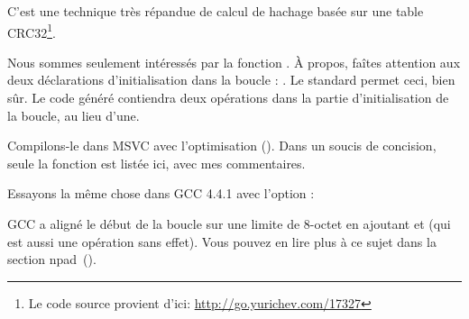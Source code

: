 \label{sec:CRC32}

\newcommand{\URLCRCSRC}{\url{http://go.yurichev.com/17327}}

C'est une technique très répandue de calcul de hachage basée sur une table
CRC32\footnote{Le code source provient d'ici: \URLCRCSRC}.




Nous sommes seulement intéressés par la fonction .
À propos, faîtes attention aux deux déclarations d'initialisation dans la boucle
: .
Le standard \CCpp permet ceci, bien sûr.
Le code généré contiendra deux opérations dans la partie d'initialisation de la boucle,
au lieu d'une.

Compilons-le dans MSVC avec l'optimisation (\Ox).
Dans un soucis de concision, seule la fonction  est listée ici, avec mes
commentaires.



Essayons la même chose dans GCC 4.4.1 avec l'option \Othree:




GCC a aligné le début de la boucle sur une limite de 8-octet en ajoutant \NOP et
 (qui est aussi une opération sans effet).
Vous pouvez en lire plus à ce sujet dans la section npad~().
